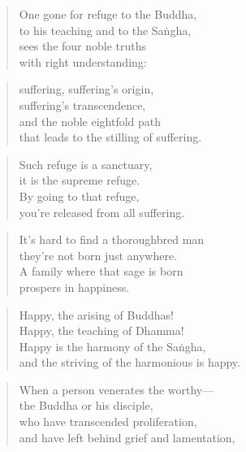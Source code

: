\documentclass[12pt,openany]{book}%
\begin{document}
\begin{verse}%
One gone for refuge to the Buddha, \\
to his teaching and to the \textsanskrit{Saṅgha}, \\
sees the four noble truths \\
with right understanding: 

%
\end{verse}

\begin{verse}%
suffering, suffering’s origin, \\
suffering’s transcendence, \\
and the noble eightfold path \\
that leads to the stilling of suffering. 

%
\end{verse}

\begin{verse}%
Such refuge is a sanctuary, \\
it is the supreme refuge. \\
By going to that refuge, \\
you’re released from all suffering. 

%
\end{verse}

\begin{verse}%
It’s hard to find a thoroughbred man \\
they’re not born just anywhere. \\
A family where that sage is born \\
prospers in happiness. 

%
\end{verse}

\begin{verse}%
Happy, the arising of Buddhas! \\
Happy, the teaching of Dhamma! \\
Happy is the harmony of the \textsanskrit{Saṅgha}, \\
and the striving of the harmonious is happy. 

%
\end{verse}

\begin{verse}%
When a person venerates the worthy—\\
the Buddha or his disciple, \\
who have transcended proliferation, \\
and have left behind grief and lamentation, 

%
\end{verse}
\end{document}
